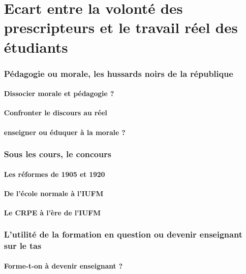 \documentclass[a4paper,11pt]{article}
\begin{document}
\part{Ecart entre la volonté des prescripteurs et le travail réel des étudiants}

\section{Pédagogie ou morale, les hussards noirs de la république}

			\subsection{Dissocier morale et pédagogie ?}
			\subsection{Confronter le discours au réel}
			\subsection{enseigner ou éduquer à la morale ?}

\section{Sous les cours, le concours}

			\subsection{Les réformes de 1905 et 1920}
			\subsection{De l'école normale à l'IUFM}
			\subsection{Le CRPE à l'ère de l'IUFM}
			
\section{L'utilité de la formation en question ou devenir enseignant sur le tas}

			\subsection{Forme-t-on à devenir enseignant ?}
\end{document}
